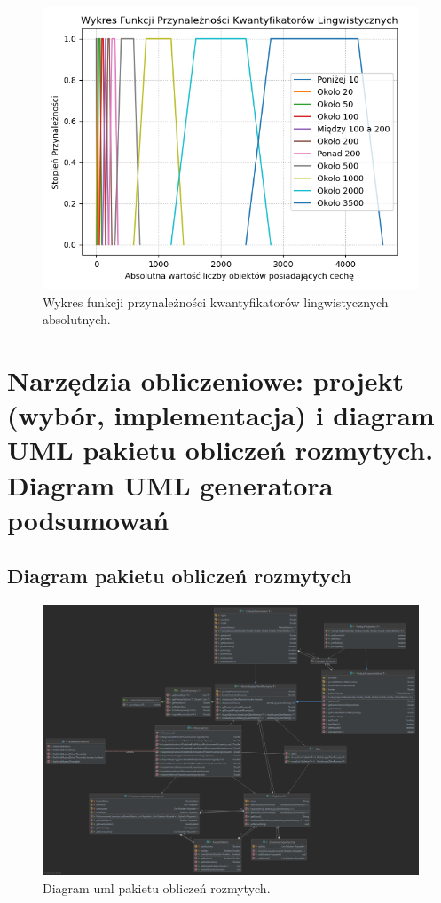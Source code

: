 \documentclass{classrep}
\begin{document}
\begin{figure}[h!]
 \centering
 \includegraphics[width=14cm]{kwantyfikatory_absolutny.png}
 \vspace{-0.3cm}
 \caption{Wykres funkcji przynależności kwantyfikatorów lingwistycznych absolutnych. }
 \label{kwantyfikatory_lingwistyczne_absolutne}
\end{figure}
\newpage

\section{Narzędzia obliczeniowe: projekt (wybór, implementacja) i diagram UML pakietu obliczeń rozmytych. Diagram UML generatora podsumowań}
\subsection{Diagram pakietu obliczeń rozmytych}

\begin{figure}[h!]
 \centering
 \includegraphics[width=14cm]{uml.png}
 \vspace{-0.3cm}
 \caption{Diagram uml pakietu obliczeń rozmytych. }
 \label{uml_obliczenia}
\end{figure}
\newpage
\end{document}
